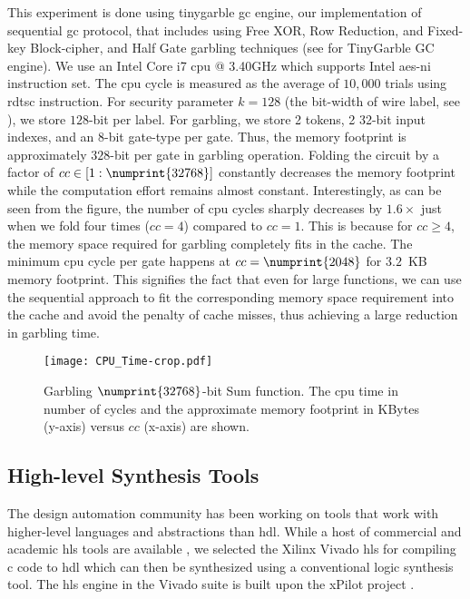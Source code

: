 This experiment is done using \gls{tinygarble} \acrshort{gc} engine, our  implementation of sequential \acrshort{gc} protocol, that includes using Free XOR, Row Reduction, and Fixed-key Block-cipher, and Half Gate garbling techniques (see  for TinyGarble GC engine).
We use an Intel Core i7 \acrshort{cpu} @ 3.40GHz which supports Intel \acrfull{aes-ni} instruction set.
The \acrshort{cpu} cycle is measured as the average of $10,000$ trials using \gls{rdtsc} instruction.
For security parameter $k=128$ (the bit-width of wire label, see ), we store $128$-bit per label.
For garbling, we store 2 tokens, 2 32-bit input indexes, and an 8-bit gate-type per gate.
Thus, the memory footprint is approximately $328$-bit per gate in garbling operation.
Folding the circuit by a factor of $cc \in [1:\numprint{32768}]$ constantly decreases the memory footprint while the computation effort remains almost constant.
Interestingly, as can be seen from the figure, the number of \acrshort{cpu} cycles sharply decreases by $1.6\times$ just when we fold four times ($cc=4$) compared to $cc=1$.
This is because for $cc \geq 4$, the memory space required for garbling completely fits in the cache.
The minimum \acrshort{cpu} cycle per gate happens at $cc=\numprint{2048}$ for $3.2$~KB memory footprint.
This signifies the fact that even for large functions, we can use the sequential approach to fit the corresponding memory space requirement into the cache and avoid the penalty of cache misses, thus achieving a large reduction in garbling time.

\begin{figure}
	\centering
	\texttt{[image: CPU\_Time-crop.pdf]}
	\caption{Garbling $\numprint{32768}$-bit Sum function.
The \acrshort{cpu} time in number of cycles and the approximate memory footprint in KBytes (y-axis) versus $cc$ (x-axis) are shown.}
	\label{fig:cpu_time}
\end{figure}

\subsection{High-level Synthesis Tools}\label{ssec:eval-tinygarble-high}
The design automation community has been working on tools that work with higher-level languages and abstractions than \acrshort{hdl}.
While a host of commercial and academic \acrshort{hls} tools are available \cite{tool:Vivado, tool:PandA, decaluwe2004myhdl, Gupta2004}, we selected the Xilinx Vivado \acrshort{hls} for compiling \gls{c} code to \acrshort{hdl} which can then be synthesized using a conventional logic synthesis tool.
The \acrshort{hls} engine in the Vivado suite is built upon the xPilot project \cite{Chapter:Zhang2008}.

